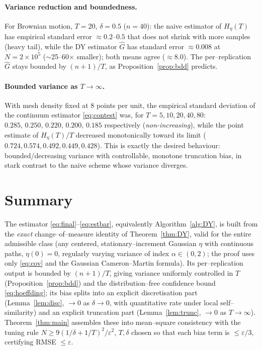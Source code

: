 \documentclass{amsart}
\theoremstyle{definition}
\begin{document}
\paragraph{Variance reduction and boundedness.}
For Brownian motion, $T=20$, $\delta=0.5$ ($n=40$): the naive estimator of
$H_\eta(T)$ has empirical standard error $\approx0.2$--$0.5$ that does not shrink
with more samples (heavy tail), while the DY estimator $\widehat G$ has standard
error $\approx0.008$ at $N=2\times10^5$ ($\sim$25--60$\times$ smaller); both means
agree ($\approx8.0$). The per--replication $\widehat G$ stays bounded by
$(n+1)/T$, as Proposition~\ref{prop:bdd} predicts.

\paragraph{Bounded variance as $T\to\infty$.}
With mesh density fixed at $8$ points per unit, the empirical standard deviation
of the continuum estimator \eqref{eq:contest} was, for
$T=5,10,20,40,80$: $0.285,\,0.250,\,0.220,\,0.200,\,0.185$ respectively
(\emph{non-increasing}), while the point estimate of $H_\eta(T)/T$ decreased
monotonically toward its limit ($0.724,0.574,0.492,0.449,0.428$). This is exactly
the desired behaviour: bounded/decreasing variance with controllable, monotone
truncation bias, in stark contrast to the naive scheme whose variance diverges.

\section{Summary}

The estimator \eqref{eq:final}--\eqref{eq:estbar}, equivalently
Algorithm~\ref{alg:DY}, is built from the \emph{exact} change--of--measure
identity of Theorem~\ref{thm:DY}, valid for the entire admissible class
(any centered, stationary--increment Gaussian $\eta$ with continuous paths,
$\eta(0)=0$, regularly varying variance of index $\alpha\in(0,2)$; the proof uses
only \eqref{eq:cov} and the Gaussian Cameron--Martin formula). Its per--replication
output is bounded by $(n+1)/T$, giving variance uniformly controlled in $T$
(Proposition~\ref{prop:bdd}) and the distribution--free confidence bound
\eqref{eq:hoeffding}; its bias splits into an explicit discretisation part
(Lemma~\ref{lem:disc}, $\to0$ as $\delta\to0$, with quantitative rate under local
self--similarity) and an explicit truncation part (Lemma~\ref{lem:trunc},
$\to0$ as $T\to\infty$). Theorem~\ref{thm:main} assembles these into mean--square
consistency with the tuning rule
$N\ge 9(1/\delta+1/T)^2/\varepsilon^2$,
$T,\delta$ chosen so that each bias term is $\le\varepsilon/3$, certifying RMSE
$\le\varepsilon$.
\end{document}
